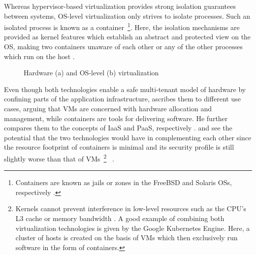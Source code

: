 Whereas hypervisor-based virtualization provides strong isolation guarantees between systems, \acs{OS}-level virtualization only strives to isolate processes. Such an isolated process is known as a container~\footnote{Containers are known as jails or zones in the FreeBSD and Solaris \acsp{OS}, respectively \cite[p.~2]{eder2016hypervisor}.}. Here, the isolation mechanisms are provided as kernel features which establish an abstract and protected view on the \acs{OS}, making two containers unaware of each other or any of the other processes which run on the host \cite[p.~2]{merkel2014docker} \cite[pp.~1--2]{eder2016hypervisor}.

\begin{figure}[htp]
    \centering
    \qquad

    \caption[Hardware and \acs*{OS}-level virtualization]{Hardware (a) and \acs*{OS}-level (b) virtualization \cite[p.~387]{morabito2015hypervisors}}
    \label{fig:hypervisor-container-virtualization}
\end{figure}

\FloatBarrier

Even though both technologies enable a safe multi-tenant model of hardware by confining parts of the application infrastructure, \citeauthor{pahl2015containerization} ascribes them to different use cases, arguing that \acp{VM} are concerned with hardware allocation and management, while containers are tools for delivering software. He further compares them to the concepts of \acs{IaaS} and \acs{PaaS}, respectively \cite[p.~24]{pahl2015containerization}. \citeauthor{eder2016hypervisor} and \citeauthor{merkel2014docker} see the potential that the two technologies would have in complementing each other since the resource footprint of containers is minimal and its security profile is still slightly worse than that of \acsp{VM}~\footnote{Kernels cannot prevent interference in low-level resources such as the \acs{CPU}'s L3 cache or memory bandwidth \cite[p.~52]{burns2016borg}. A good example of combining both virtualization technologies is given by the Google Kubernetes Engine. Here, a cluster of hosts is created on the basis of \acsp{VM} which then exclusively run software in the form of containers.}~\cite[p.~6]{eder2016hypervisor} \cite[p.~2]{merkel2014docker}.

